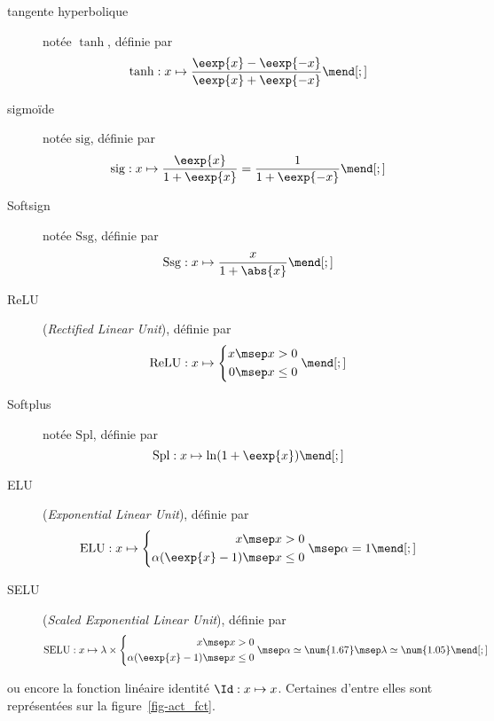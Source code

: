 \begin{description}
\item[tangente hyperbolique] notée $\tanh$, définie par
\begin{equation}
\tanh
:x\mapsto
\frac{\eexp{x}-\eexp{-x}}{\eexp{x}+\eexp{-x}}
\label{eq-act_fct-tanh}
\mend[;]
\end{equation}
\item[sigmoïde] notée $\mathrm{sig}$, définie par
\begin{equation}
\mathrm{sig}
:x\mapsto
\frac{\eexp{x}}{1+\eexp{x}} = \frac{1}{1+\eexp{-x}}
\label{eq-act_fct-sig}
\mend[;]
\end{equation}
\item[Softsign] notée $\mathrm{Ssg}$, définie par
\begin{equation}
\mathrm{Ssg}
:x\mapsto
\frac{x}{1+\abs{x}}
\label{eq-act_fct-ssg}
\mend[;]
\end{equation}
\item[ReLU] (\emph{Rectified Linear Unit}), définie par
\begin{equation}
\mathrm{ReLU}
:x\mapsto
\left\lbrace \begin{aligned}
x\msep & x > 0\\
0\msep & x \leq 0
\end{aligned} \right.
\label{eq-act_fct-relu}
\mend[;]
\end{equation}
\item[Softplus] notée $\mathrm{Spl}$, définie par
\begin{equation}
\mathrm{Spl}
:x\mapsto
\ln(1+\eexp{x})
\label{eq-act_fct-spl}
\mend[;]
\end{equation}
\item[ELU] (\emph{Exponential Linear Unit}), définie par
\begin{equation}
\mathrm{ELU}
:x\mapsto
\left\lbrace \begin{aligned}
x\msep & x > 0\\
\alpha(\eexp{x}-1)\msep & x \leq 0
\end{aligned} \right.
\msep
\alpha=1
\label{eq-act_fct-elu}
\mend[;]
\end{equation}
\item[SELU] (\emph{Scaled Exponential Linear Unit}), définie par
\begin{equation}
\mathrm{SELU}
:x\mapsto
\lambda\times\left\lbrace \begin{aligned}
x\msep & x > 0\\
\alpha(\eexp{x}-1)\msep & x \leq 0
\end{aligned} \right.
\msep
\alpha \simeq \num{1.67}
\msep
\lambda \simeq \num{1.05}
\label{eq-act_fct-selu}
\mend[;]
\end{equation}
\end{description}
ou encore la fonction linéaire identité $\Id:x\mapsto x$.
Certaines d'entre elles sont représentées sur la figure~\ref{fig-act_fct}.
